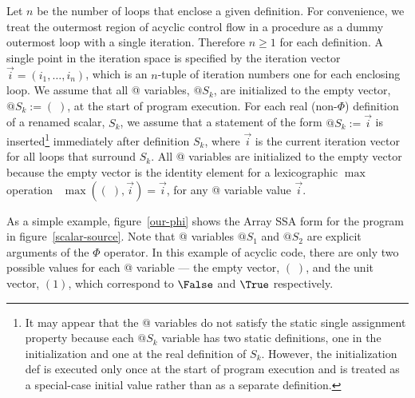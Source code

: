 Let $n$ be the number of loops that
enclose a given definition.  For convenience, we treat the outermost
region of acyclic control flow in a procedure as a dummy outermost loop
with a single iteration.  Therefore $n \geq 1$ for
each definition.
A single point in the
iteration space is specified by the iteration vector
$\vec{i} = (i_1, \ldots, i_n)$, which is
an 
$n$-tuple of iteration numbers
one for each enclosing loop. 
We assume that all @ variables, $@S_k$, are initialized to the empty
vector, $@S_k := (\;)$, at the start of program execution.  For each
real (non-$\Phi$) definition of a renamed scalar, $S_k$, we assume that a statement of the
form $@S_k := \vec{i}$ is inserted\footnote{ It may appear that the @ variables do not satisfy the
static single assignment property because each $@S_k$ variable has two
static definitions, one in the initialization and one at the real
definition of $S_k$.  However, the initialization def is executed only
once at the start of program execution and is treated as a special-case
initial value rather than as a separate definition.} immediately after definition
$S_k$, where $\vec{i}$
is the current iteration vector for all loops that surround
$S_k$. 
All @ variables are initialized
to the empty vector because the empty vector is the identity element
for a lexicographic $\max$ operation \ie\ $\max((\;),\vec{i}) =
\vec{i}$, for any @ variable value $\vec{i}$.


As a simple example,
figure~\ref{our-phi} shows the
Array SSA
form for the program in figure~\ref{scalar-source}.
Note that @ variables $@S_1$ and $@S_2$ are explicit arguments
of the $\Phi$ operator.
In this example of acyclic code, there are only two possible
values for each @ variable --- the empty vector, $(\;)$, and the unit vector,
$(1)$, which correspond to $\False$ and $\True$ respectively.



